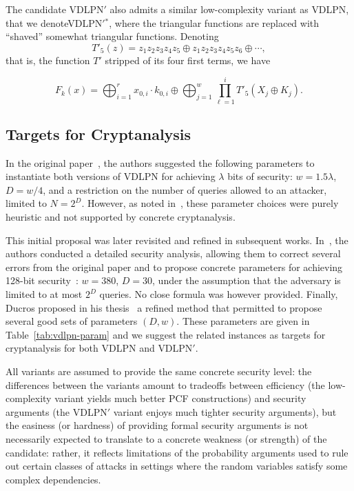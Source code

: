 \documentclass[journal=tosc,submission]{iacrtrans}
\theoremstyle{theorem}
\begin{document}
The candidate {\sf VDLPN}$'$ also admits a similar low-complexity variant as {\sf VDLPN}, that we denote{{\sf VDLPN}$'$}$^*$, where the triangular functions are replaced with ``shaved'' somewhat triangular functions. Denoting
\[T'_5(z) = z_1z_2z_3z_4z_5 \oplus z_1z_2z_3z_4z_5z_6 \oplus \cdots,\]
that is, the function $T'$ stripped of its four first terms, we have

\begin{equation} \label{eq:vdlpn*_low}
    F_k(x) = \bigoplus_{i=1}^{r} x_{0,i}\cdot k_{0,i} \oplus \bigoplus_{j=1}^w \prod_{\ell=1}^i T'_5(X_j \oplus K_j).
\end{equation}

\subsection{Targets for Cryptanalysis}

In the original paper~\cite{vdlpn}, the authors suggested the following parameters to instantiate both versions of {\sf VDLPN} for achieving $\lambda$ bits of security: $w = 1.5\lambda$, $D = w/4$, and a restriction on the number of queries allowed to an attacker, limited to $N = 2^D$. However, as noted in~\cite{PKC:CouDuc23}, these parameter choices were purely heuristic and not supported by concrete cryptanalysis.

This initial proposal was later revisited and refined in subsequent works. In~\cite{PKC:CouDuc23}, the authors conducted a detailed security analysis, allowing them to correct several errors from the original paper and to propose concrete parameters for achieving 128-bit security~: $w = 380$, $D = 30$, under the assumption that the adversary is limited to at most $2^D$ queries. No close formula was however provided. Finally, Ducros proposed in his thesis~\cite{Ducros24} a refined method that permitted to propose several good sets of parameters $(D,w)$. These parameters are given in Table~\ref{tab:vdlpn-param} and we suggest the related instances as targets for cryptanalysis for both {\sf VDLPN} and {\sf VDLPN}$'$.

All variants are assumed to provide the same concrete security level: the differences between the variants amount to tradeoffs between efficiency (the low-complexity variant yields much better PCF constructions) and security arguments (the {\sf VDLPN}$'$ variant enjoys much tighter security arguments), but the easiness (or hardness) of providing formal security arguments is not necessarily expected to translate to a concrete weakness (or strength) of the candidate: rather, it reflects limitations of the probability arguments used to rule out certain classes of attacks in settings where the random variables satisfy some complex dependencies.
\end{document}

